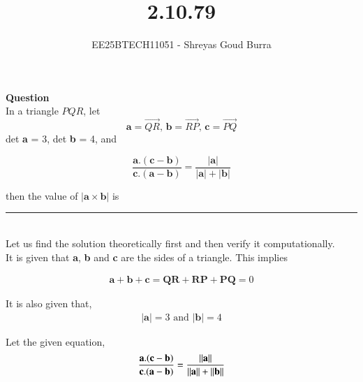 \documentclass[journal]{IEEEtran}
\begin{document}

\vspace{3cm}

\title{2.10.79}
\author{EE25BTECH11051 - Shreyas Goud Burra}
\maketitle
{\let\newpage\relax\maketitle}

\renewcommand{\thefigure}{\theenumi}
\renewcommand{\thetable}{\theenumi}
\setlength{\intextsep}{10pt}


\renewcommand{\thetable}{\theenumi}

\textbf{Question}\\
In a triangle $PQR$, let\\
$$\textbf{a}=\vec{QR},\, \textbf{b}=\vec{RP},\, \textbf{c}=\vec{PQ}$$
det \textbf{a} = 3,  det \textbf{b} = 4, and

$$\frac{\textbf{a}.(\textbf{c}-\textbf{b})}{\textbf{c}.(\textbf{a}-\textbf{b})}=\frac{\lvert \textbf{a}\rvert}{\lvert \textbf{a}\rvert+\lvert \textbf{b} \rvert}$$

then the value of $\lvert \textbf{a} \times \textbf{b} \rvert$ is \rule{1.5cm}{0.5mm}

\solution\\

Let us find the solution theoretically first and then verify it computationally.\\
It is given that \textbf{a}, \textbf{b} and \textbf{c} are the sides of a triangle. This implies

\begin{align}
    \textbf{a}+\textbf{b}+\textbf{c} = \textbf{QR}+\textbf{RP}+\textbf{PQ} = 0
    \label{0.1}
\end{align}

It is also given that,
\begin{align}
    \lvert \textbf{a} \rvert=3\text{ and }\lvert \textbf{b} \rvert = 4
    \label{0.2}
\end{align}

Let the given equation,
\begin{align}
    \frac{\textbf{a}.(\textbf{c}-\textbf{b})}{\textbf{c}.(\textbf{a}-\textbf{b})}=\frac{\left\lVert\textbf{a}\right\rVert}{\left\lVert\textbf{a}\right\rVert+\left\lVert\textbf{b}\right\rVert}
    \label{0.3}
\end{align}
\end{document}
